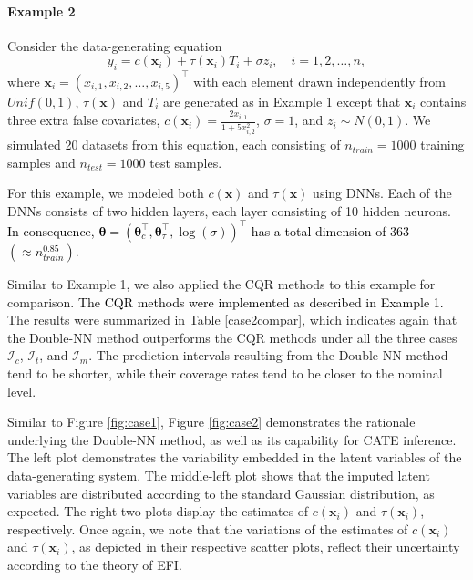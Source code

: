 \documentclass[11pt]{article}
\newcommand{\bx}{{\boldsymbol x}}
\newcommand{\btheta}{{\boldsymbol \theta}}
\begin{document}

\paragraph{Example 2} 
 Consider the data-generating equation  
\begin{equation} \label{dataGex2}
y_i=c(\bx_i)+\tau(\bx_i) T_i +\sigma z_i, \quad i=1,2,\ldots,n,
\end{equation}
where $\bx_i=(x_{i,1},x_{i,2},\ldots,x_{i,5})^{\top}$ with each element drawn independently 
from $Unif(0,1)$, $\tau(\bx)$ and $T_i$ are generated as in Example 1 except that $\bx_i$ contains three extra false covariates,  
$c(\bx_i)=\frac{2x_{i,1}}{1+5x_{i,2}^2}$, $\sigma=1$, and $z_i \sim N(0,1)$. 
We simulated 20 datasets from this equation, each consisting of 
$n_{train}=1000$ training samples and $n_{test}=1000$ test samples. 

For this example, we modeled both $c(\bx)$ and $\tau(\bx)$ using DNNs. Each of the DNNs 
consists of two hidden layers, each layer consisting of 10 hidden neurons. 
\textcolor{black}{In consequence, $\btheta=(\btheta_c^{\top},\btheta_{\tau}^{\top},\log(\sigma))^{\top}$ has a total 
dimension of 363 $(\approx n_{train}^{0.85})$.} 



Similar to Example 1, we also applied the CQR methods \citep{lei2021ite} to 
this example for comparison. 
\textcolor{black}{The CQR methods were implemented as described in Example 1.}
The results were summarized in Table \ref{case2compar},
which indicates again that the Double-NN method outperforms  the CQR methods
under all the three cases $\mathcal{I}_c$, $\mathcal{I}_t$, and $\mathcal{I}_m$. 
 The prediction intervals resulting from the Double-NN method tend to be shorter, 
 while their coverage rates tend to be closer to the nominal level. 


 Similar to Figure \ref{fig:case1},  Figure \ref{fig:case2} demonstrates the rationale
 underlying the Double-NN method, as well as its capability for CATE inference.
 The left plot demonstrates the variability 
 embedded in the latent variables of the data-generating system. The middle-left 
 plot shows that the imputed latent variables are distributed according to the 
 standard Gaussian distribution, as expected. The right two plots display the 
 estimates of $c(\bx_i)$ and $\tau(\bx_i)$, respectively. 
 Once again, we note that the variations of the estimates of $c(\bx_i)$ and $\tau(\bx_i)$, 
 as depicted in their respective scatter plots, reflect their uncertainty according to 
 the theory of EFI.   
\end{document}
